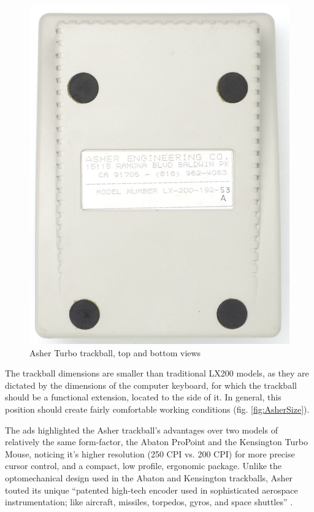 \documentclass[11pt, a4paper]{article}
\begin{document}
\begin{figure}[h]
    \includegraphics[scale=0.65]{1988_asher_turbo_trackball/bottom_15.jpg}
    \caption{Asher Turbo trackball, top and bottom views}
    \label{fig:AsherTopBottom}
\end{figure}

The trackball dimensions are smaller than traditional LX200 models, as they are dictated by the dimensions of the computer keyboard, for which the trackball should be a functional extension, located to the side of it. In general, this position should create fairly comfortable working conditions (fig. \ref{fig:AsherSize}).

The ads highlighted the Asher trackball's advantages over two models of relatively the same form-factor, the Abaton ProPoint and the Kensington Turbo Mouse, noticing it's higher resolution (250 CPI vs. 200 CPI) for more precise cursor control, and a compact, low profile, ergonomic package. Unlike the optomechanical design used in the Abaton and Kensington trackballs, Asher touted its unique ``patented high-tech encoder used in sophisticated aerospace instrumentation; like aircraft, missiles, torpedos, gyros, and space shuttles'' \cite{turbo}.
\end{document}
